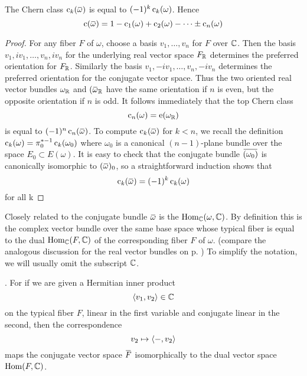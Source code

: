 \documentclass[../main]{subfiles}
\begin{document}
\begin{lemma}\label{lem:14.9}
The Chern class $\chernclass_k(\xoverline{\omega})$ is equal to $(-1)^k \operatorname{c}_k(\omega)$. Hence \[\chernclass(\xoverline{\omega}) = 1-\chernclass_1(\omega)+\chernclass_2(\omega)-\dots \pm \chernclass_n(\omega)\]
\end{lemma}
\begin{proof}
For any fiber $F$ of $\omega$, choose a basis $v_1,\dots,v_n$ for $F$ over $\mathbb C$. Then the basis $v_1,iv_1,\dots,v_n,iv_n$ for the underlying real vector space $F_\mathbb R$ determines the preferred orientation for $F_\mathbb R$. Similarly the basis $v_1,-iv_1,\dots,v_n,-iv_n$ determines the preferred orientation for the conjugate vector space. Thus the two oriented real vector bundles $\omega_\mathbb R$ and $(\xoverline{\omega}_\bR$ have the same orientation if $n$ is even, but the opposite orientation if $n$ is odd. It follows immediately that the top Chern class
\[\operatorname{c}_n (\omega)=\operatorname{e}(\omega_\mathbb R)\]
is equal to $(-1)^n\chernclass_n(\xoverline{\omega})$. To compute $\chernclass_k(\xoverline{\omega})$ for $k<n$, we recall the definition $\operatorname{c}_k(\omega)=\pi_0^{*-1} \operatorname{c}_k(\omega_0)$ where $\omega_0$ is a canonical $(n-1)$-plane bundle over the space $E_0\subset E(\omega)$. It is easy to check that the conjugate bundle $\xoverline{(\omega_0)}$ is canonically isomorphic to $(\xoverline{\omega})_0$, so a straightforward induction shows that
\[\chernclass_k(\xoverline{\omega}) = (-1)^k \chernclass_k(\omega)\]
for all k
\end{proof}

Closely related to the conjugate bundle $\xoverline{\omega}$ is the  $\operatorname{Hom}_\mathbb C(\omega,\mathbb C)$. By definition this is the complex vector bundle over the same base space whose typical fiber is equal to the dual $\operatorname{Hom}_\mathbb C(F,\mathbb C)$ of the corresponding fiber $F$ of $\omega$. (compare the analogous discussion for the real vector bundles on p. \pageref{functors on vectors}) To simplify the notation, we will usually omit the subscript $\mathbb C$. 

. For if we are given a Hermitian inner product
\[\langle v_1,v_2\rangle\in \mathbb C\]
on the typical fiber $F$, linear in the first variable and conjugate linear in the second, then the correspondence
\[v_2\mapsto \langle-,v_2\rangle\]
maps the conjugate vector space $\xoverline{F}$ isomorphically to the dual vector space $\operatorname{Hom}(F,\mathbb C)$.\newpage
\end{document}
